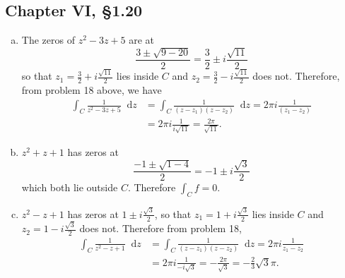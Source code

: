 \documentclass{article}
\newcommand\dif{\mathop{}\!\mathrm{d}}
\begin{document}
\subsection*{Chapter VI, \S1.20}
\begin{enumerate}[(a)]
  \item{
    The zeros of $z^2 - 3z + 5$ are at
    $$
      \frac{3 \pm \sqrt{9 - 20}}{2}
    = \frac{3}{2} \pm i\frac{\sqrt{11}}{2}
    $$
    so that $z_1 = \frac{3}{2} + i \frac{\sqrt{11}}{2}$ lies inside
    $C$ and $z_2 = \frac{3}{2} - i \frac{\sqrt{11}}{2}$ does not.
    Therefore, from problem 18 above, we have
    \begin{align*}
       \int_C \frac{1}{z^2 - 3z + 5} \dif z
    &= \int_C \frac{1}{(z - z_1)(z - z_2)} \dif z
     = 2 \pi i \frac{1}{(z_1 - z_2)} \\
    &= 2 \pi i \frac{1}{i \sqrt{11}} = \frac{2 \pi}{\sqrt{11}}.
    \end{align*}
  }
  \item{
    $z^2 + z + 1$ has zeros at 
    $$
      \frac{-1 \pm \sqrt{1 - 4}}{2}
    = -1 \pm i \frac{\sqrt{3}}{2}
    $$ 
    which both lie outside $C$.
    Therefore $\int_C f = 0$.
  }
  \item{
    $z^2 - z + 1$ has zeros at $1 \pm i \frac{\sqrt{3}}{2}$, so that
    $z_1 = 1 + i\frac{\sqrt{3}}{2}$ lies inside $C$ and 
    $z_2 = 1 - i\frac{\sqrt{3}}{2}$ does not. Therefore from problem 18,
    \begin{align*}
       \int_C \frac{1}{z^2 - z + 1} \dif z
    &= \int_C \frac{1}{(z - z_1)(z - z_2)} \dif z
     = 2 \pi i \frac{1}{z_1 - z_2} \\
    &= 2 \pi i \frac{1}{-i \sqrt{3}}
     = -\frac{2 \pi}{\sqrt{3}} = -\frac{2}{3} \sqrt{3} \pi.
    \end{align*}
  }
\end{enumerate}
\end{document}
